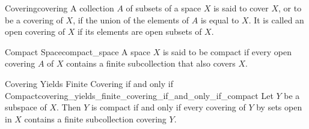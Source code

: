 \begin{definition}{Covering}{covering}
A collection $A$ of subsets of a space $X$ is said to cover $X$, or to be a covering of $X$, if the union of the elements of $A$ is equal to $X$. It is called an open covering of $X$ if its elements are open subsets of $X$.
\end{definition}

\begin{definition}{Compact Space}{compact_space}
A space $X$ is said to be compact if every open covering $A$ of $X$ contains a finite subcollection that also covers $X$.
\end{definition}

\begin{lemma}{Covering Yields Finite Covering if and only if Compact}{covering_yields_finite_covering_if_and_only_if_compact}
Let $Y$ be a subspace of $X$. Then $Y$ is compact if and only if every covering of $Y$ by sets open in $X$ contains a finite subcollection covering $Y$.
\end{lemma}
